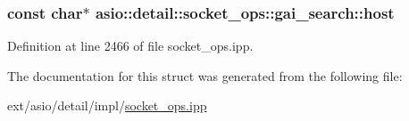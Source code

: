 \hypertarget{structasio_1_1detail_1_1socket__ops_1_1gai__search_ae3775a9ebda48fefcd1905a07770e001}{}
\subsubsection[{host}]{\setlength{\rightskip}{0pt plus 5cm}const char$\ast$ asio\+::detail\+::socket\+\_\+ops\+::gai\+\_\+search\+::host}\label{structasio_1_1detail_1_1socket__ops_1_1gai__search_ae3775a9ebda48fefcd1905a07770e001}


Definition at line 2466 of file socket\+\_\+ops.\+ipp.



The documentation for this struct was generated from the following file\+:\begin{DoxyCompactItemize}
\item 
ext/asio/detail/impl/\hyperlink{socket__ops_8ipp}{socket\+\_\+ops.\+ipp}\end{DoxyCompactItemize}
